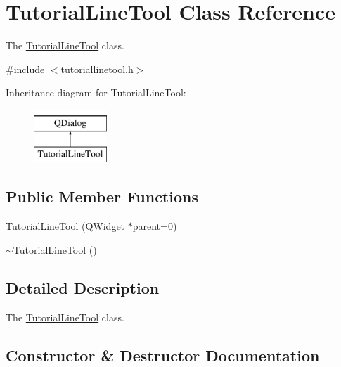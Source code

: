 \hypertarget{class_tutorial_line_tool}{}\section{Tutorial\+Line\+Tool Class Reference}
\label{class_tutorial_line_tool}


The \hyperlink{class_tutorial_line_tool}{Tutorial\+Line\+Tool} class.  




{\ttfamily \#include $<$tutoriallinetool.\+h$>$}

Inheritance diagram for Tutorial\+Line\+Tool\+:\begin{figure}[H]
\begin{center}
\leavevmode
\includegraphics[height=2.000000cm]{class_tutorial_line_tool}
\end{center}
\end{figure}
\subsection*{Public Member Functions}
\begin{DoxyCompactItemize}
\item 
\hyperlink{class_tutorial_line_tool_af4e5c2a7e79544e7c6fc7e21d0007347}{Tutorial\+Line\+Tool} (Q\+Widget $\ast$parent=0)
\item 
\hyperlink{class_tutorial_line_tool_a03f51cf61b5bbf1798e86452195aeef2}{$\sim$\+Tutorial\+Line\+Tool} ()
\end{DoxyCompactItemize}


\subsection{Detailed Description}
The \hyperlink{class_tutorial_line_tool}{Tutorial\+Line\+Tool} class. 

\subsection{Constructor \& Destructor Documentation}
\mbox{\label{class_tutorial_line_tool_af4e5c2a7e79544e7c6fc7e21d0007347}} 
